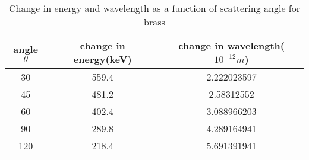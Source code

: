 \begin{table}
    \centering
    \begin{tabular}{|c|c|c|}
        \hline
        angle $\theta$ & change in energy(keV) & change in wavelength($10^{-12}m$) \\ \hline
        30             & 559.4                 & 2.222023597                       \\ \hline
        45             & 481.2                 & 2.58312552                        \\ \hline
        60             & 402.4                 & 3.088966203                       \\ \hline
        90             & 289.8                 & 4.289164941                       \\ \hline
        120            & 218.4                 & 5.691391941                       \\ \hline
    \end{tabular}
    \caption{Change in energy and wavelength as a function of scattering angle for brass}
    \label{tab:3}
\end{table}